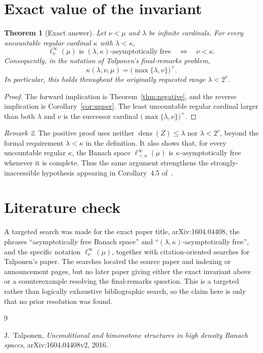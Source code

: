 \documentclass[11pt]{article}
\newtheorem{theorem}{Theorem}
\theoremstyle{remark}
\newtheorem{remark}[theorem]{Remark}
\newcommand{\dens}{\operatorname{dens}}
\begin{document}
\section{Exact value of the invariant}

\begin{theorem}[Exact answer]
\label{thm:exact}
Let \(\nu<\mu\) and \(\lambda\) be infinite cardinals.  For every
uncountable regular cardinal \(\kappa\) with \(\lambda<\kappa\),
\[
 \ell_\nu^\infty(\mu)
 \text{ is }(\lambda,\kappa)\text{-asymptotically free}
 \quad\Longleftrightarrow\quad
 \nu<\kappa.
\]
Consequently, in the notation of Talponen's final-remarks problem,
\[
 \boxed{\displaystyle
 \kappa(\lambda,\nu,\mu)
 =\bigl(\max\{\lambda,\nu\}\bigr)^+.}
\]
In particular, this holds throughout the originally requested range
\(\lambda<2^\nu\).
\end{theorem}

\begin{proof}
The forward implication is Theorem~\ref{thm:negative}, and the reverse
implication is Corollary~\ref{cor:upper}.  The least uncountable regular
cardinal larger than both \(\lambda\) and \(\nu\) is the successor
cardinal \(\bigl(\max\{\lambda,\nu\}\bigr)^+\).
\end{proof}

\begin{remark}
The positive proof uses neither \(\dens(Z)\leq\lambda\) nor
\(\lambda<2^\nu\), beyond the formal requirement \(\lambda<\kappa\) in
the definition.  It also shows that, for every uncountable regular
\(\kappa\), the Banach space \(\ell_{<\kappa}^\infty(\mu)\) is
\(\kappa\)-asymptotically free whenever it is complete.  Thus the same
argument strengthens the strongly-inaccessible hypothesis appearing in
Corollary~4.5 of~\cite{Talponen}.
\end{remark}

\section{Literature check}

A targeted search was made for the exact paper title, arXiv:1604.04408,
the phrases ``asymptotically free Banach space'' and
``\((\lambda,\kappa)\)-asymptotically free'', and the specific notation
\(\ell_\nu^\infty(\mu)\), together with citation-oriented searches for
Talponen's paper.  The searches located the source paper and indexing or
announcement pages, but no later paper giving either the exact invariant
above or a counterexample resolving the final-remarks question.  This is
a targeted rather than logically exhaustive bibliographic search, so the
claim here is only that no prior resolution was found.

\begin{thebibliography}{9}

J.~Talponen,
\emph{Unconditional and bimonotone structures in high density Banach spaces},
arXiv:1604.04408v2, 2016.

\end{thebibliography}
\end{document}
